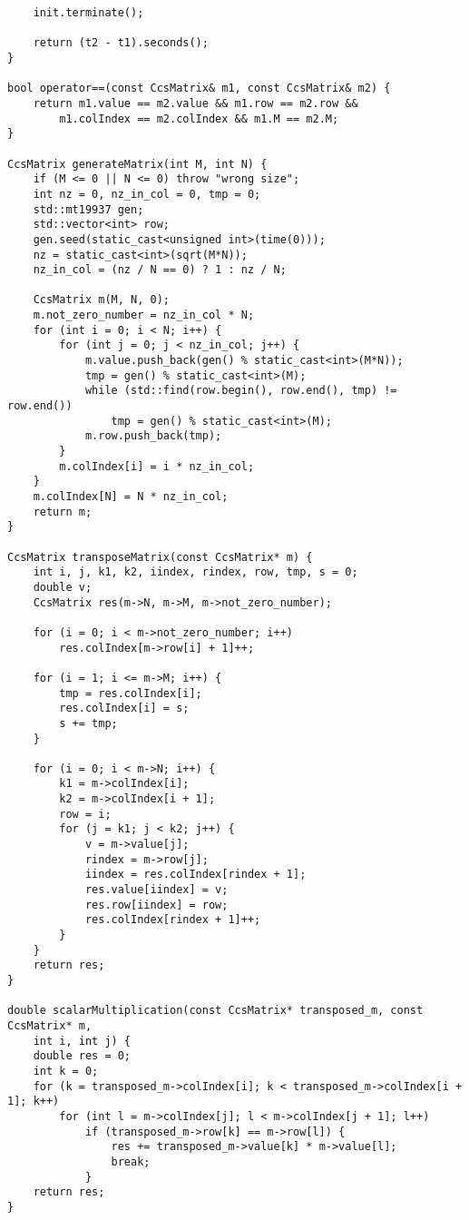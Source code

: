 \documentclass{report}
\begin{document}
\begin{lstlisting}
    init.terminate();

    return (t2 - t1).seconds();
}

bool operator==(const CcsMatrix& m1, const CcsMatrix& m2) {
    return m1.value == m2.value && m1.row == m2.row &&
        m1.colIndex == m2.colIndex && m1.M == m2.M;
}

CcsMatrix generateMatrix(int M, int N) {
    if (M <= 0 || N <= 0) throw "wrong size";
    int nz = 0, nz_in_col = 0, tmp = 0;
    std::mt19937 gen;
    std::vector<int> row;
    gen.seed(static_cast<unsigned int>(time(0)));
    nz = static_cast<int>(sqrt(M*N));
    nz_in_col = (nz / N == 0) ? 1 : nz / N;

    CcsMatrix m(M, N, 0);
    m.not_zero_number = nz_in_col * N;
    for (int i = 0; i < N; i++) {
        for (int j = 0; j < nz_in_col; j++) {
            m.value.push_back(gen() % static_cast<int>(M*N));
            tmp = gen() % static_cast<int>(M);
            while (std::find(row.begin(), row.end(), tmp) != row.end())
                tmp = gen() % static_cast<int>(M);
            m.row.push_back(tmp);
        }
        m.colIndex[i] = i * nz_in_col;
    }
    m.colIndex[N] = N * nz_in_col;
    return m;
}

CcsMatrix transposeMatrix(const CcsMatrix* m) {
    int i, j, k1, k2, iindex, rindex, row, tmp, s = 0;
    double v;
    CcsMatrix res(m->N, m->M, m->not_zero_number);

    for (i = 0; i < m->not_zero_number; i++)
        res.colIndex[m->row[i] + 1]++;

    for (i = 1; i <= m->M; i++) {
        tmp = res.colIndex[i];
        res.colIndex[i] = s;
        s += tmp;
    }

    for (i = 0; i < m->N; i++) {
        k1 = m->colIndex[i];
        k2 = m->colIndex[i + 1];
        row = i;
        for (j = k1; j < k2; j++) {
            v = m->value[j];
            rindex = m->row[j];
            iindex = res.colIndex[rindex + 1];
            res.value[iindex] = v;
            res.row[iindex] = row;
            res.colIndex[rindex + 1]++;
        }
    }
    return res;
}

double scalarMultiplication(const CcsMatrix* transposed_m, const CcsMatrix* m,
    int i, int j) {
    double res = 0;
    int k = 0;
    for (k = transposed_m->colIndex[i]; k < transposed_m->colIndex[i + 1]; k++)
        for (int l = m->colIndex[j]; l < m->colIndex[j + 1]; l++)
            if (transposed_m->row[k] == m->row[l]) {
                res += transposed_m->value[k] * m->value[l];
                break;
            }
    return res;
}


\end{lstlisting}
\end{document}
